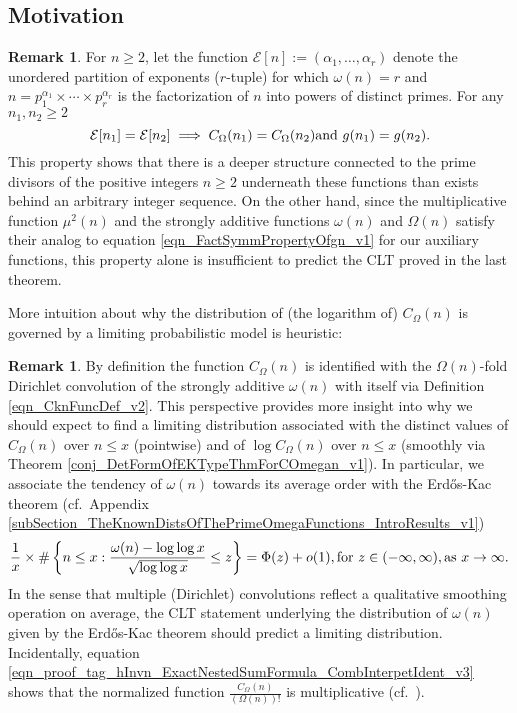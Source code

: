 \documentclass[11pt,reqno,a4letter]{article}
\newcommand{\hlocalref}[1]{\hyperref[#1]{\ref{#1}}}
\numberwithin{equation}{section}
\numberwithin{figure}{section}
\numberwithin{table}{section}
\newcommand{\cf}{cf.~}
\theoremstyle{plain}
\numberwithin{theorem}{section}
\theoremstyle{definition}
\newtheorem{remark}[theorem]{Remark}
\theoremstyle{remark}
\newcommand{\mathtext}[1]{\text{\rm #1}}
\begin{document}
\subsection{Motivation}

\begin{remark}
\label{remark_COmegaFuncDistIntutitionFromErdosKac_v1}
For $n \geq 2$, let the function 
$\mathcal{E}[n] := (\alpha_1, \ldots, \alpha_r)$ denote the unordered 
partition of exponents ($r$-tuple) for which $\omega(n) = r$ and 
$n = p_1^{\alpha_1} \times \cdots \times p_r^{\alpha_r}$ is the factorization of 
$n$ into powers of distinct primes. 
For any $n_1,n_2 \geq 2$ 
\begin{equation}
\label{eqn_FactSymmPropertyOfgn_v1} 
\mathcal{E}[n_1] = \mathcal{E}[n_2] \implies C_{\Omega}(n_1) = C_{\Omega}(n_2) \mathtext{ and } 
	g(n_1) = g(n_2). 
\end{equation}
This property shows that there is a deeper structure connected to the 
prime divisors of the positive integers $n \geq 2$ underneath these functions 
than exists behind an arbitrary integer sequence. 
On the other hand, since the multiplicative function $\mu^2(n)$ and the 
strongly additive functions $\omega(n)$ and $\Omega(n)$ satisfy their 
analog to equation \eqref{eqn_FactSymmPropertyOfgn_v1} for our auxiliary functions, 
this property alone is insufficient to predict the CLT proved in the last theorem. 
\end{remark}

More intuition about why the distribution of (the logarithm of) $C_{\Omega}(n)$ 
is governed by a limiting probabilistic model is heuristic: 

\begin{remark}
By definition the function $C_{\Omega}(n)$ is identified with the $\Omega(n)$-fold 
Dirichlet convolution of the strongly additive $\omega(n)$ with itself via 
Definition \hlocalref{eqn_CknFuncDef_v2}. 
This perspective provides more insight into why we should expect to find a limiting distribution 
associated with the distinct values of 
$C_{\Omega}(n)$ over $n \leq x$ (pointwise) and of $\log C_{\Omega}(n)$ over $n \leq x$ 
(smoothly via Theorem \hlocalref{conj_DetFormOfEKTypeThmForCOmegan_v1}). 
In particular, we associate the tendency of $\omega(n)$ towards its average order 
with the Erd\H{o}s-Kac theorem 
(\cf Appendix \hlocalref{subSection_TheKnownDistsOfThePrimeOmegaFunctions_IntroResults_v1}) 
\[
\frac{1}{x} \times \#\left\{n \leq x: \frac{\omega(n) - \log\log x}{\sqrt{\log\log x}} \leq z\right\} = 
	\Phi(z) + o(1), 
	\mathtext{ for } z \in (-\infty, \infty), 
	\mathtext{ as } x \rightarrow \infty. 
\]
In the sense that multiple (Dirichlet) convolutions 
reflect a qualitative smoothing operation on average, the CLT statement underlying the 
distribution of $\omega(n)$ given by the Erd\H{o}s-Kac theorem 
should predict a limiting distribution. 
Incidentally, equation \eqref{eqn_proof_tag_hInvn_ExactNestedSumFormula_CombInterpetIdent_v3} 
shows that the normalized function $\frac{C_{\Omega}(n)}{(\Omega(n))!}$ is multiplicative 
(\cf \cite{ELLIOTT-V1}). 
\end{remark}
\end{document}
